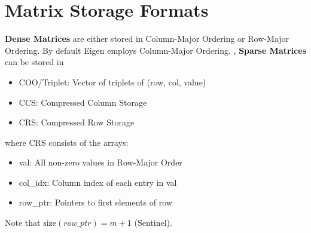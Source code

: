\section{Matrix Storage Formats}
\textbf{Dense Matrices} are either stored in Column-Major Ordering or Row-Major Ordering. By default Eigen employs Column-Major Ordering.
\sep
\textbf{Sparse Matrices} can be stored in
\begin{itemize}
	\item COO/Triplet: Vector of triplets of (row, col, value)
  	\item CCS: Compressed Column Storage
  	\item CRS: Compressed Row Storage
\end{itemize}
where CRS consists of the arrays:
\begin{itemize}
	\item val: All non-zero values in Row-Major Order
	\item col\_idx: Column index of each entry in val
  	\item row\_ptr: Pointers to first elements of row
\end{itemize}

Note that $\text{size}(row\_ptr)=m+1$ (Sentinel).


